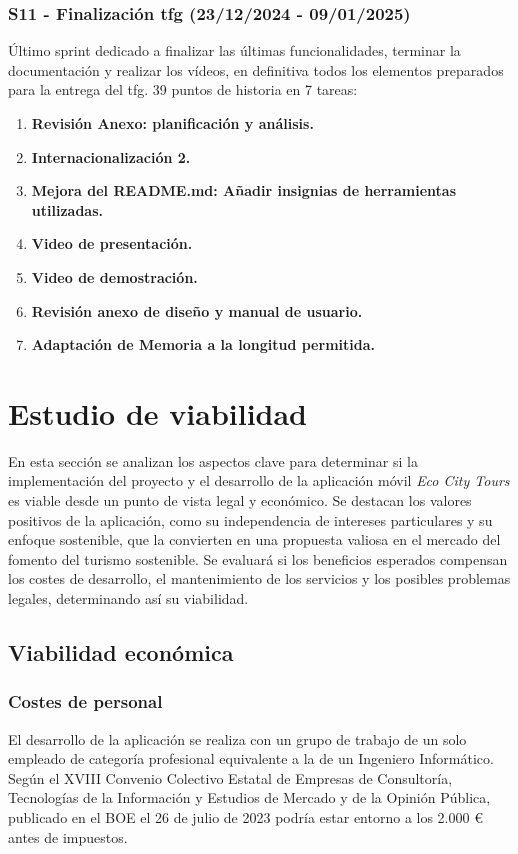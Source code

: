 \subsubsection{S11 - Finalización \acrshort{tfg} (23/12/2024 - 09/01/2025)}
Último sprint dedicado a finalizar las últimas funcionalidades, terminar la documentación y realizar los vídeos, en definitiva todos los elementos preparados para la entrega del \acrfull{tfg}. 39 puntos de historia en 7 tareas:
\begin{enumerate}
	\item \textbf{Revisión Anexo: planificación y análisis.}
	\item \textbf{Internacionalización 2.}
	\item \textbf{Mejora del README.md: Añadir insignias de herramientas utilizadas.}
	\item \textbf{Video de presentación.}
	\item \textbf{Video de demostración.}
	\item \textbf{Revisión anexo de diseño y manual de usuario.}
	\item \textbf{Adaptación de Memoria a la longitud permitida.}
\end{enumerate}




\section{Estudio de viabilidad}
En esta sección se analizan los aspectos clave para determinar si la implementación del proyecto y el desarrollo de la aplicación móvil \textit{Eco City Tours} es viable desde un punto de vista legal y económico. Se destacan los valores positivos de la aplicación, como su independencia de intereses particulares y su enfoque sostenible, que la convierten en una propuesta valiosa en el mercado del fomento del turismo sostenible. Se evaluará si los beneficios esperados compensan los costes de desarrollo, el mantenimiento de los servicios y los posibles problemas legales, determinando así su viabilidad.
\subsection{Viabilidad económica}
\subsubsection{Costes de personal}
El desarrollo de la aplicación se realiza con un grupo de trabajo de un solo empleado de categoría profesional equivalente a la de un Ingeniero Informático. Según el XVIII Convenio Colectivo Estatal de Empresas de Consultoría, Tecnologías de la Información y Estudios de Mercado y de la Opinión Pública, publicado en el BOE el 26 de julio de 2023 \cite{boe2023_consultoria} podría estar entorno a los 2.000 € antes de impuestos.

